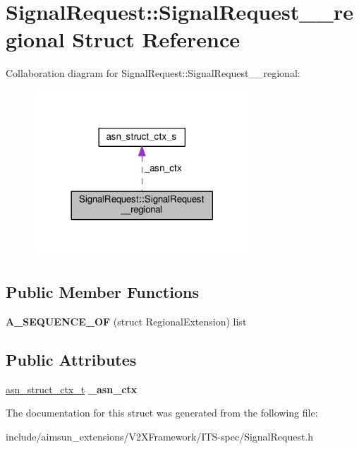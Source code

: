 \hypertarget{structSignalRequest_1_1SignalRequest____regional}{}\section{Signal\+Request\+:\+:Signal\+Request\+\_\+\+\_\+regional Struct Reference}
\label{structSignalRequest_1_1SignalRequest____regional}


Collaboration diagram for Signal\+Request\+:\+:Signal\+Request\+\_\+\+\_\+regional\+:\nopagebreak
\begin{figure}[H]
\begin{center}
\leavevmode
\includegraphics[width=230pt]{structSignalRequest_1_1SignalRequest____regional__coll__graph}
\end{center}
\end{figure}
\subsection*{Public Member Functions}
\begin{DoxyCompactItemize}
\item 
{\bfseries A\+\_\+\+S\+E\+Q\+U\+E\+N\+C\+E\+\_\+\+OF} (struct Regional\+Extension) list\hypertarget{structSignalRequest_1_1SignalRequest____regional_a3e24466b070c6a8bebe1358bf472d09b}{}\label{structSignalRequest_1_1SignalRequest____regional_a3e24466b070c6a8bebe1358bf472d09b}

\end{DoxyCompactItemize}
\subsection*{Public Attributes}
\begin{DoxyCompactItemize}
\item 
\hyperlink{structasn__struct__ctx__s}{asn\+\_\+struct\+\_\+ctx\+\_\+t} {\bfseries \+\_\+asn\+\_\+ctx}\hypertarget{structSignalRequest_1_1SignalRequest____regional_ae548ace98fca54d4bfecb2b3598b854b}{}\label{structSignalRequest_1_1SignalRequest____regional_ae548ace98fca54d4bfecb2b3598b854b}

\end{DoxyCompactItemize}


The documentation for this struct was generated from the following file\+:\begin{DoxyCompactItemize}
\item 
include/aimsun\+\_\+extensions/\+V2\+X\+Framework/\+I\+T\+S-\/spec/Signal\+Request.\+h\end{DoxyCompactItemize}
